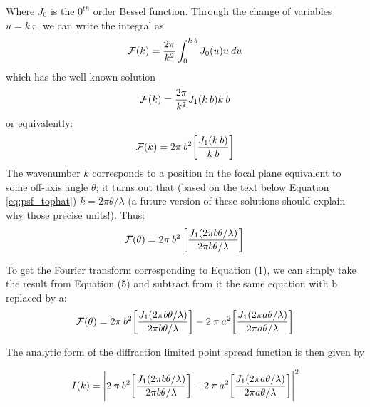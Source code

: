 \begin{answer}
Where $J_0$ is the $0^{th}$ order Bessel function. Through the change of variables $u=k \: r$, we can  write the integral as 
\begin{equation}
\mathcal{F}(k) = \frac{2\pi}{k^2} \int_{0}^{k \: b} J_0 (u) u \: du \\ \\
\end{equation}
which has the well known solution
\begin{equation}
\mathcal{F}(k) = \frac{2\pi}{k^2} J_1 (k \: b) k \: b  \\ \\
\end{equation}
or equivalently:
\begin{equation}
\mathcal{F}(k) = 2 \pi \: b^2 \bigg[ \frac{J_1 (k \: b)}{k \: b} \bigg]  \\ \\
\end{equation}
The wavenumber $k$ corresponds to a position in the focal plane
equivalent to some off-axis angle $\theta$; it turns out that (based
on the text below Equation \ref{eq:psf_tophat}) $k=2\pi\theta
/ \lambda$ (a future version of these solutions should explain why
those precise units!). Thus:
\begin{equation}
\mathcal{F}(\theta) = 2\pi \: b^2 \left[
\frac{J_1 (2\pi b \theta /\lambda)}{2\pi b \theta / \lambda} \right]  \\ \\
\end{equation}

To get the Fourier transform corresponding to Equation (1), we can
simply take the result from Equation (5) and subtract from it the same
equation with b replaced by a:
\begin{equation}
\mathcal{F}(\theta) = 2 \pi \: b^2 \bigg[
\frac{J_1 (2\pi b \theta/\lambda)}{2\pi b \theta / \lambda} \bigg] -
2 \: \pi \: a^2 \bigg[ \frac{J_1 (2 \pi a \theta/\lambda)}{2\pi
a \theta / \lambda} \bigg]  \\ \\
\end{equation}

The analytic form of the diffraction limited point spread function is
then given by

\begin{equation}
I(k) = \Bigg| 2 \: \pi \: b^2 \bigg[ \frac{J_1 (2 \pi b \theta
/\lambda)}{2\pi b \theta / \lambda} \bigg]
- 2 \: \pi \: a^2 \bigg[ \frac{J_1 (2 \pi a \theta / \lambda)}{2\pi
a \theta/\lambda} \bigg] \Bigg|^2  \\ \\
\end{equation}
\end{answer}

